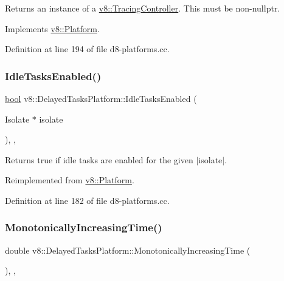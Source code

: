 Returns an instance of a \mbox{\hyperlink{classv8_1_1TracingController}{v8\+::\+Tracing\+Controller}}. This must be non-\/nullptr. 

Implements \mbox{\hyperlink{classv8_1_1Platform_aa760c7bf8c46495eb650d2be72399747}{v8\+::\+Platform}}.



Definition at line 194 of file d8-\/platforms.\+cc.

\mbox{\label{classv8_1_1DelayedTasksPlatform_a1ac3788b072ee705cd2de6cc08556295}} 
\subsubsection{\texorpdfstring{Idle\+Tasks\+Enabled()}{IdleTasksEnabled()}}
{\footnotesize\ttfamily \mbox{\hyperlink{classbool}{bool}} v8\+::\+Delayed\+Tasks\+Platform\+::\+Idle\+Tasks\+Enabled (\begin{DoxyParamCaption}\item[{Isolate $\ast$}]{isolate }\end{DoxyParamCaption})\hspace{0.3cm}{\ttfamily [inline]}, {\ttfamily [override]}, {\ttfamily [virtual]}}

Returns true if idle tasks are enabled for the given $\vert$isolate$\vert$. 

Reimplemented from \mbox{\hyperlink{classv8_1_1Platform_ad229642bf16a066d2e8d866dc128141e}{v8\+::\+Platform}}.



Definition at line 182 of file d8-\/platforms.\+cc.

\mbox{\label{classv8_1_1DelayedTasksPlatform_a071eea7329b3d7ed1f2b9c4a444bf128}} 
\subsubsection{\texorpdfstring{Monotonically\+Increasing\+Time()}{MonotonicallyIncreasingTime()}}
{\footnotesize\ttfamily double v8\+::\+Delayed\+Tasks\+Platform\+::\+Monotonically\+Increasing\+Time (\begin{DoxyParamCaption}{ }\end{DoxyParamCaption})\hspace{0.3cm}{\ttfamily [inline]}, {\ttfamily [override]}, {\ttfamily [virtual]}}

